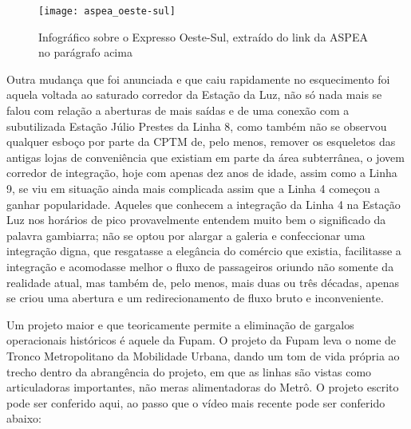 \documentclass[11pt,fleqn]{book} %
\begin{document}
\begin{figure}[htb]
	\centering
	\texttt{[image: aspea\_oeste-sul]}
	\caption[Diagrama do Expresso Oeste-Sul]{Infográfico sobre o Expresso Oeste-Sul, extraído do link da ASPEA no parágrafo acima}
	\label{fig:aspea_oeste-sul}
\end{figure}

Outra mudança que foi anunciada e que caiu rapidamente no esquecimento foi aquela voltada ao saturado corredor da Estação da Luz, não só nada mais se falou com relação a aberturas de mais saídas e de uma conexão com a subutilizada Estação Júlio Prestes da Linha 8, como também não se observou qualquer esboço por parte da CPTM de, pelo menos, remover os esqueletos das antigas lojas de conveniência que existiam em parte da área subterrânea, o jovem corredor de integração, hoje com apenas dez anos de idade, assim como a Linha 9, se viu em situação ainda mais complicada assim que a Linha 4 começou a ganhar popularidade. Aqueles que conhecem a integração da Linha 4 na Estação Luz nos horários de pico provavelmente entendem muito bem o significado da palavra gambiarra; não se optou por alargar a galeria e confeccionar uma integração digna, que resgatasse a elegância do comércio que existia, facilitasse a integração e acomodasse melhor o fluxo de passageiros oriundo não somente da realidade atual, mas também de, pelo menos, mais duas ou três décadas, apenas se criou uma abertura e um redirecionamento de fluxo bruto e inconveniente.

Um projeto maior e que teoricamente permite a eliminação de gargalos operacionais históricos é aquele da Fupam. O projeto da Fupam leva o nome de Tronco Metropolitano da Mobilidade Urbana, dando um tom de vida própria ao trecho dentro da abrangência do projeto, em que as linhas são vistas como articuladoras importantes, não meras alimentadoras do Metrô. O projeto escrito pode ser conferido aqui, ao passo que o vídeo mais recente pode ser conferido abaixo:

\end{document}
